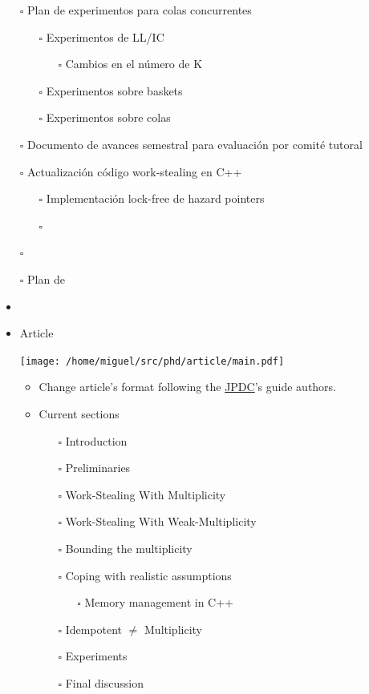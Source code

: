 \documentclass[openany, a4paper]{book}
\theoremstyle{break}
\theoremstyle{example}
\theoremstyle{note}
\theoremstyle{break}
\theoremstyle{exercise}
\begin{document}
\begin{itemize}
\item[{$\square$}] Plan de experimentos para colas concurrentes
\begin{itemize}
\item[{$\square$}] Experimentos de LL/IC
\begin{itemize}
\item[{$\square$}] Cambios en el número de K
\end{itemize}
\item[{$\square$}] Experimentos sobre baskets
\item[{$\square$}] Experimentos sobre colas
\end{itemize}
\item[{$\square$}] Documento de avances semestral para evaluación por comité tutoral
\item[{$\square$}] Actualización código work-stealing en C++
\begin{itemize}
\item[{$\square$}] Implementación lock-free de hazard pointers
\item[{$\square$}]
\end{itemize}
\item[{$\square$}]

\item[{$\square$}] Plan de
\item
\end{itemize}
\begin{itemize}
\item Article \begin{center}
\texttt{[image: /home/miguel/src/phd/article/main.pdf]}
\end{center}
\begin{itemize}
\item Change article's format following the \href{https://www.elsevier.com/journals/journal-of-parallel-and-distributed-computing/0743-7315/guide-for-authors}{JPDC}'s guide authors.
\item Current sections
\begin{itemize}
\item[{$\square$}] Introduction
\item[{$\square$}] Preliminaries
\item[{$\square$}] Work-Stealing With Multiplicity
\item[{$\square$}] Work-Stealing With Weak-Multiplicity
\item[{$\square$}] Bounding the multiplicity
\item[{$\square$}] Coping with realistic assumptions
\begin{itemize}
\item[{$\square$}] Memory management in C++
\end{itemize}
\item[{$\square$}] Idempotent \(\neq\) Multiplicity
\item[{$\square$}] Experiments
\item[{$\square$}] Final discussion
\end{itemize}
\end{itemize}
\end{itemize}
\end{document}
